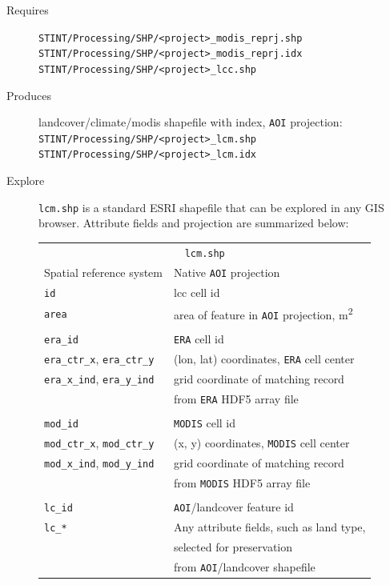 \documentclass[twoside,a4paper]{refart}
\begin{document}
  \begin{description}
    \item [Requires]
      \texttt{STINT/Processing/SHP/<project>\_modis\_reprj.shp} \\
      \texttt{STINT/Processing/SHP/<project>\_modis\_reprj.idx} \\
      \texttt{STINT/Processing/SHP/<project>\_lcc.shp}
  
  
    \item [Produces]
      landcover/climate/modis shapefile with index, 
      \texttt{AOI} projection:\\
      \texttt{STINT/Processing/SHP/<project>\_lcm.shp}\\
      \texttt{STINT/Processing/SHP/<project>\_lcm.idx}
      

    \item [Explore]
      \texttt{lcm.shp} is a standard ESRI shapefile that can be explored in any GIS browser.  Attribute fields and projection are summarized below:
      
\begin{tabular}{ll}
       \multicolumn{2}{c}{\texttt{lcm.shp}} \\
Spatial reference system        & Native \texttt{AOI} projection \\
\texttt{id}                     & lcc cell id \\
\texttt{area}                   & area of feature in \texttt{AOI} projection, m\textsuperscript{2}\\  
\\
\texttt{era\_id}                & \texttt{ERA} cell id \\  
\texttt{era\_ctr\_x}, \texttt{era\_ctr\_y} & (lon, lat) coordinates, \texttt{ERA} cell center \\
\texttt{era\_x\_ind}, \texttt{era\_y\_ind} & grid coordinate of matching record \\
                                          & from \texttt{ERA} HDF5 array file\\
\\
\texttt{mod\_id}                & \texttt{MODIS} cell id \\  
\texttt{mod\_ctr\_x}, \texttt{mod\_ctr\_y} & (x, y) coordinates, \texttt{MODIS} cell center \\
\texttt{mod\_x\_ind}, \texttt{mod\_y\_ind} & grid coordinate of matching record \\
                                          & from \texttt{MODIS} HDF5 array file\\
\\
\texttt{lc\_id}                & \texttt{AOI}/landcover feature id \\
\texttt{lc\_*}                & Any attribute fields, such as land type, \\
                             & selected for preservation \\
                             & from \texttt{AOI}/landcover shapefile \\
\end{tabular}


\end{description}
\end{document}
